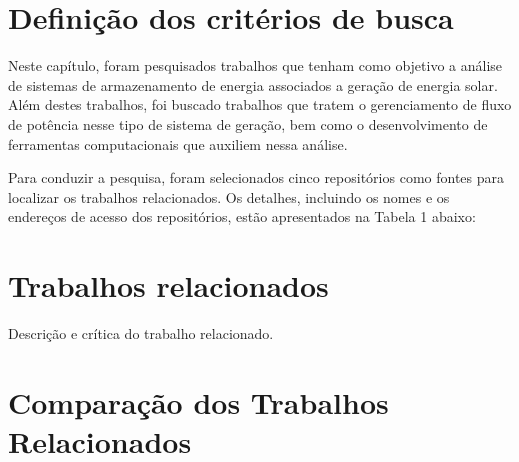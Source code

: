 \section{Definição dos critérios de busca}
\label{s_c3_trabalho-1}


Neste capítulo, foram pesquisados trabalhos que tenham como objetivo a análise de sistemas de armazenamento de energia associados a geração de energia solar. Além destes trabalhos, foi buscado trabalhos que tratem o gerenciamento de fluxo de potência nesse tipo de sistema de geração, bem como o desenvolvimento de ferramentas computacionais que auxiliem nessa análise.

Para conduzir a pesquisa, foram selecionados cinco repositórios como fontes para localizar os trabalhos relacionados. Os detalhes, incluindo os nomes e os endereços de acesso dos repositórios, estão apresentados na Tabela 1 abaixo:






\section{Trabalhos relacionados}
\label{s_c3_trabalho-2}

Descrição e crítica do trabalho relacionado.






\section{Comparação dos Trabalhos Relacionados}
\label{s_c3_comparacao}


